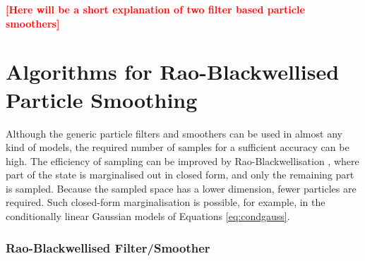 \documentclass[twocolumn]{autart}    %
\newcommand{\comment}[1]{\textcolor{red}{\textbf{[#1]}}}
\begin{document}
\comment{Here will be a short explanation of two filter based particle
  smoothers}


\section{Algorithms for Rao-Blackwellised Particle Smoothing}

Although the generic particle filters and smoothers can be used in almost any kind of models, the required number of samples for a sufficient accuracy can be high. The efficiency of sampling can be improved by Rao-Blackwellisation \cite{Doucet+Godsill+Andrieu:2000,Chen+Liu:2000}, where part of the state is marginalised out in closed form, and only the remaining part is sampled. Because the sampled space has a lower dimension, fewer particles are required. Such closed-form marginalisation is possible, for example, in the conditionally linear Gaussian models of Equations \eqref{eq:condgauss}.

\subsubsection{Rao-Blackwellised Filter/Smoother}
\end{document}
